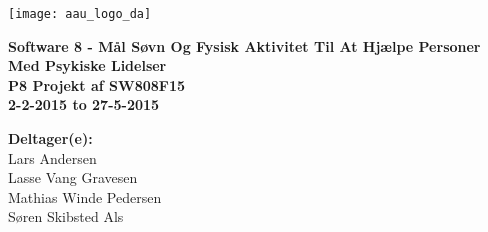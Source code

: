 \hspace*{-1cm}\parbox[b][\textheight][t]{\textwidth}
{

\begin{center}
	\texttt{[image: aau\_logo\_da]}\\
	\vspace{0.25cm}
\end{center} 

\vspace{1cm}
\begin{center}

\textbf{\Huge {Software 8 - Mål Søvn Og Fysisk Aktivitet Til At Hjælpe Personer Med Psykiske Lidelser}} \\ \vspace{0.5cm}
\textbf{\Large P8 Projekt af SW808F15}\\ \vspace{0.5cm}
\textbf{\large 2-2-2015 to 27-5-2015}\\
\end{center}



\vspace{0.25cm}
\begin{center}
\item {\textbf{Deltager(e):}} \\
Lars Andersen\\
Lasse Vang Gravesen\\
Mathias Winde Pedersen\\
Søren Skibsted Als
\end{center}

\thispagestyle{empty}

\newpage
\thispagestyle{empty}
\mbox{}
}